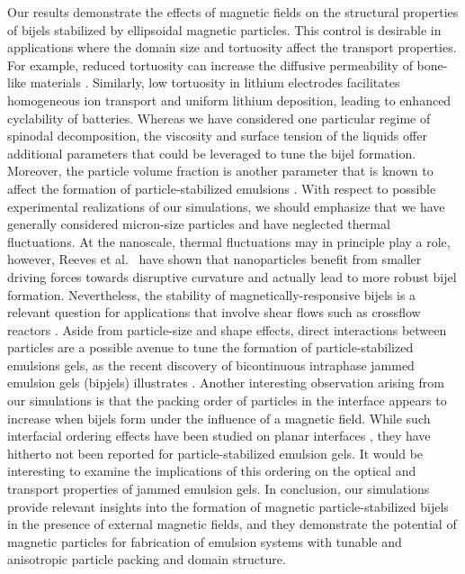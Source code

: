 Our results demonstrate the effects of magnetic fields on the structural
properties of bijels stabilized by ellipsoidal magnetic particles. This
control is desirable in applications where the domain size and
tortuosity affect the transport properties. For example, reduced
tortuosity can increase the diffusive permeability of bone-like
materials \cite{prakoso2023tortuosity}. Similarly, low tortuosity
in lithium electrodes facilitates homogeneous ion transport and
uniform lithium deposition, leading to enhanced cyclability of
batteries\cite{chen_tortuosity_2020, ebner_tortuosity_2014}. Whereas we
have considered one particular regime of spinodal decomposition, the
viscosity and surface tension of the liquids offer additional parameters
that could be leveraged to tune the bijel formation. Moreover, the
particle volume fraction is another parameter that is known to affect
the formation of particle-stabilized emulsions
\cite{jansen_bijels_2011,hijnen_bijels_2015}. With respect to possible
experimental realizations of our simulations, we should emphasize that
we have generally considered micron-size particles and have neglected
thermal fluctuations. At the nanoscale, thermal fluctuations may in
principle play a role, however, Reeves et
al.~\cite{reeves_particle-size_2015} have shown that nanoparticles
benefit from smaller driving forces towards disruptive curvature and
actually lead to more robust bijel formation. Nevertheless, the
stability of magnetically-responsive bijels is a relevant question for
applications that involve shear flows such as crossflow reactors
\cite{khan_nanostructured_2022}. Aside from particle-size and shape
effects, direct interactions between particles are a possible avenue
to tune the formation of particle-stabilized emulsions gels, as the
recent discovery of bicontinuous intraphase jammed emulsion gels
(bipjels) illustrates \cite{kinkead_bicontinuous_2019}. Another
interesting observation arising from our simulations is that the
packing order of particles in the interface appears to increase when
bijels form under the influence of a magnetic field. While such
interfacial ordering effects have been studied on planar interfaces
\cite{toor_self-assembly_2016,shi_nanoparticle_2018,kim_dynamic_2022},
they have hitherto not been reported for particle-stabilized emulsion
gels. It would be interesting to examine the implications of this
ordering on the optical and transport properties of jammed emulsion
gels. In conclusion, our simulations provide relevant insights into the
formation of magnetic particle-stabilized bijels in the presence of
external magnetic fields, and they demonstrate the potential of magnetic
particles for fabrication of emulsion systems with tunable and
anisotropic particle packing and domain structure.

